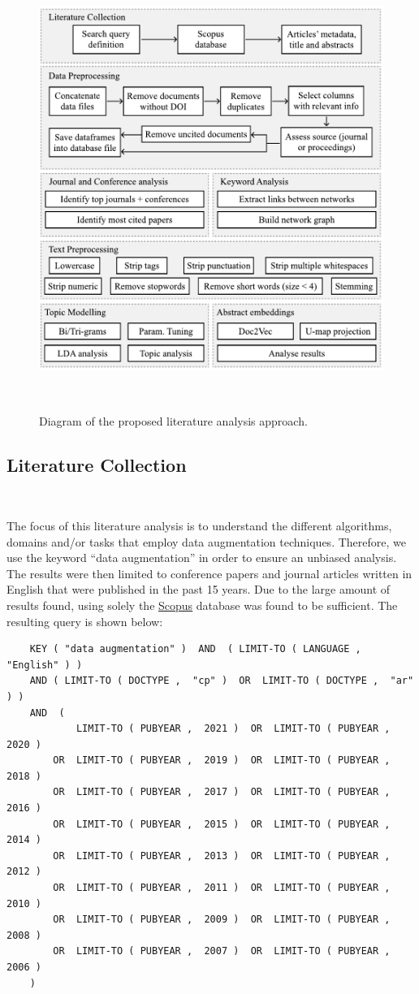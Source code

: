 \documentclass[parskip=full]{scrartcl}
\begin{document}
\begin{figure}[H]
	\centering
	\includegraphics[width=.75\linewidth]{../analysis/slr_diagram}
    \caption{Diagram of the proposed literature analysis approach.
    }~\label{fig:slr_diagram}
\end{figure}

\subsection{Literature Collection}~\label{sec:lit_collection}

The focus of this literature analysis is to understand the different
algorithms, domains and/or tasks that employ data augmentation techniques.
Therefore, we use the keyword ``data augmentation'' in order to ensure an
unbiased analysis. The results were then limited to conference papers and
journal articles written in English that were published in the past 15 years.
Due to the large amount of results found, using solely the
\href{https://www.scopus.com/}{Scopus} database was found to be sufficient.
The resulting query is shown below:

\begin{verbatim}
    KEY ( "data augmentation" )  AND  ( LIMIT-TO ( LANGUAGE ,  "English" ) )  
    AND ( LIMIT-TO ( DOCTYPE ,  "cp" )  OR  LIMIT-TO ( DOCTYPE ,  "ar" ) )  
    AND  (
            LIMIT-TO ( PUBYEAR ,  2021 )  OR  LIMIT-TO ( PUBYEAR ,  2020 )  
        OR  LIMIT-TO ( PUBYEAR ,  2019 )  OR  LIMIT-TO ( PUBYEAR ,  2018 )  
        OR  LIMIT-TO ( PUBYEAR ,  2017 )  OR  LIMIT-TO ( PUBYEAR ,  2016 )  
        OR  LIMIT-TO ( PUBYEAR ,  2015 )  OR  LIMIT-TO ( PUBYEAR ,  2014 )  
        OR  LIMIT-TO ( PUBYEAR ,  2013 )  OR  LIMIT-TO ( PUBYEAR ,  2012 )  
        OR  LIMIT-TO ( PUBYEAR ,  2011 )  OR  LIMIT-TO ( PUBYEAR ,  2010 )  
        OR  LIMIT-TO ( PUBYEAR ,  2009 )  OR  LIMIT-TO ( PUBYEAR ,  2008 )  
        OR  LIMIT-TO ( PUBYEAR ,  2007 )  OR  LIMIT-TO ( PUBYEAR ,  2006 ) 
    )  
\end{verbatim}
\end{document}
